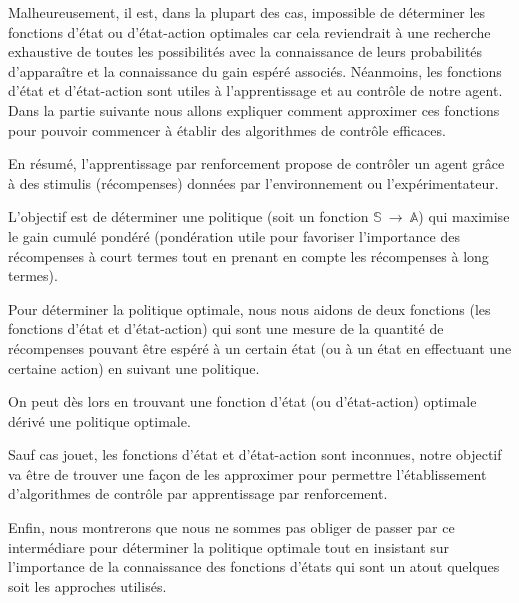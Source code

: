 Malheureusement, il est, dans la plupart des cas, impossible de déterminer les fonctions d'état ou d'état-action optimales car cela reviendrait à une recherche exhaustive de toutes les possibilités avec la connaissance de leurs probabilités d'apparaître et la connaissance du gain espéré associés. Néanmoins, les fonctions d'état et d'état-action sont utiles à l'apprentissage et au contrôle de notre agent. Dans la partie suivante nous allons expliquer comment approximer ces fonctions pour pouvoir commencer à établir des algorithmes de contrôle efficaces.

En résumé, l'apprentissage par renforcement propose de contrôler un agent grâce à des stimulis (récompenses) données par l'environnement ou l'expérimentateur. 

L'objectif est de déterminer une politique (soit un fonction $\mathbb{S} \: \rightarrow \: \mathbb{A}$) qui maximise le gain cumulé pondéré (pondération utile pour favoriser l'importance des récompenses à court termes tout en prenant en compte les récompenses à long termes).


Pour déterminer la politique optimale, nous nous aidons de deux fonctions (les fonctions d'état et d'état-action) qui sont une mesure de la quantité de récompenses pouvant être espéré à un certain état (ou à un état en effectuant une certaine action) en suivant une politique. 

On peut dès lors en trouvant une fonction d'état (ou d'état-action) optimale dérivé une politique optimale. 

Sauf cas jouet, les fonctions d'état et d'état-action sont inconnues, notre objectif va être de trouver une façon de les approximer pour permettre l'établissement d'algorithmes de contrôle par apprentissage par renforcement.


Enfin, nous montrerons que nous ne sommes pas obliger de passer par ce intermédiare pour déterminer la politique optimale tout en insistant sur l'importance de la connaissance des fonctions d'états qui sont un atout quelques soit les approches utilisés.

